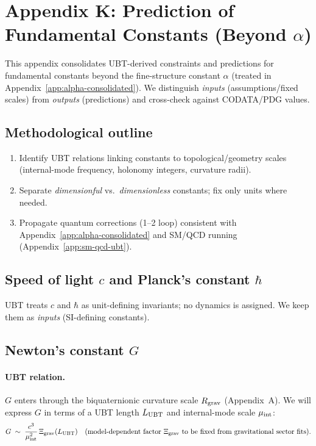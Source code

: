 \section{Appendix K: Prediction of Fundamental Constants (Beyond $\alpha$)}
\label{app:fundamental-constants}

This appendix consolidates UBT-derived constraints and predictions for fundamental constants beyond the fine-structure constant $\alpha$ (treated in Appendix~\ref{app:alpha-consolidated}). We distinguish \emph{inputs} (assumptions/fixed scales) from \emph{outputs} (predictions) and cross-check against CODATA/PDG values.

\subsection{Methodological outline}
\begin{enumerate}
\item Identify UBT relations linking constants to topological/geometry scales (internal-mode frequency, holonomy integers, curvature radii).
\item Separate \emph{dimensionful} vs.\ \emph{dimensionless} constants; fix only units where needed.
\item Propagate quantum corrections (1–2 loop) consistent with Appendix~\ref{app:alpha-consolidated} and SM/QCD running (Appendix~\ref{app:sm-qcd-ubt}).
\end{enumerate}

\subsection{Speed of light $c$ and Planck's constant $\hbar$}
UBT treats $c$ and $\hbar$ as unit-defining invariants; no dynamics is assigned. We keep them as \emph{inputs} (SI-defining constants).

\subsection{Newton's constant $G$}
\paragraph{UBT relation.} $G$ enters through the biquaternionic curvature scale $R_{\rm grav}$ (Appendix~A). We will express $G$ in terms of a UBT length $L_{\rm UBT}$ and internal-mode scale $\mu_{\rm int}$:
\begin{equation}
G \;\sim\; \frac{c^3}{\mu_{\rm int}^2}\,\Xi_{\rm grav}(L_{\rm UBT}) \quad\text{(model-dependent factor $\Xi_{\rm grav}$ to be fixed from gravitational sector fits).}
\end{equation}


